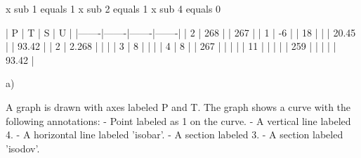 x sub 1 equals 1  
x sub 2 equals 1  
x sub 4 equals 0

|   P   |   T   |   S   |   U   |
|-------|-------|-------|-------|
| 2     | 268   |       | 267   |
| 1     | -6    |       | 18    |
|       | 20.45 |       | 93.42 |
| 2     | 2.268 |       |       |
| 3     | 8     |       |       |
| 4     | 8     |       | 267   |
|       |       |       | 11    |
|       |       |       | 259   |
|       |       |       | 93.42 |

a)

A graph is drawn with axes labeled P and T. The graph shows a curve with the following annotations:
- Point labeled as 1 on the curve.
- A vertical line labeled 4.
- A horizontal line labeled 'isobar'.
- A section labeled 3.
- A section labeled 'isodov'.